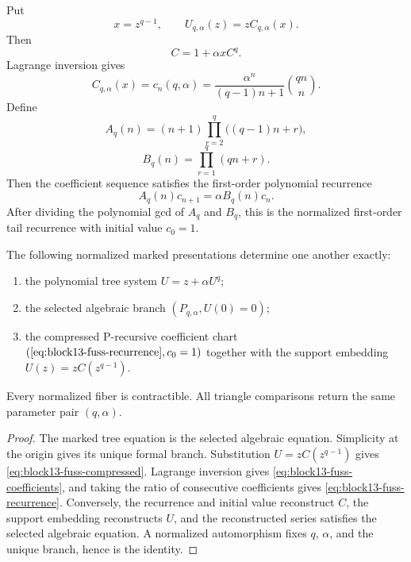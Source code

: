 Put
\[
 x=z^{q-1},
 \qquad
 U_{q,\alpha}(z)=zC_{q,\alpha}(x).
\]
Then
\begin{equation}
 C=1+\alpha xC^q.
 \label{eq:block13-fuss-compressed}
\end{equation}
Lagrange inversion gives
\begin{equation}
 [x^n]C_{q,\alpha}(x)
 =
 c_n(q,\alpha)
 =
 \frac{\alpha^n}{(q-1)n+1}
 \binom{qn}{n}.
 \label{eq:block13-fuss-coefficients}
\end{equation}
Define
\[
 A_q(n)
 =(n+1)\prod_{r=2}^{q}\bigl((q-1)n+r\bigr),
\]
\[
 B_q(n)
 =\prod_{r=1}^{q}(qn+r).
\]
Then the coefficient sequence satisfies the first-order polynomial recurrence
\begin{equation}
 \boxed{
 A_q(n)c_{n+1}
 =
 \alpha B_q(n)c_n.}
 \label{eq:block13-fuss-recurrence}
\end{equation}
After dividing the polynomial gcd of \(A_q\) and \(B_q\), this is the normalized first-order tail recurrence with initial value \(c_0=1\).

\begin{theorem}
\label{thm:block13-fuss-equivalence}
The following normalized marked presentations determine one another exactly:
\begin{enumerate}
\item the polynomial tree system \(U=z+\alpha U^q\);
\item the selected algebraic branch \((P_{q,\alpha},U(0)=0)\);
\item the compressed P-recursive coefficient chart \((\cref{eq:block13-fuss-recurrence},c_0=1)\) together with the support embedding \(U(z)=zC(z^{q-1})\).
\end{enumerate}
Every normalized fiber is contractible.  All triangle comparisons return the same parameter pair \((q,\alpha)\).
\end{theorem}

\begin{proof}
The marked tree equation is the selected algebraic equation.  Simplicity at the origin gives its unique formal branch.  Substitution \(U=zC(z^{q-1})\) gives \cref{eq:block13-fuss-compressed}.  Lagrange inversion gives \cref{eq:block13-fuss-coefficients}, and taking the ratio of consecutive coefficients gives \cref{eq:block13-fuss-recurrence}.  Conversely, the recurrence and initial value reconstruct \(C\), the support embedding reconstructs \(U\), and the reconstructed series satisfies the selected algebraic equation.  A normalized automorphism fixes \(q\), \(\alpha\), and the unique branch, hence is the identity.
\end{proof}

